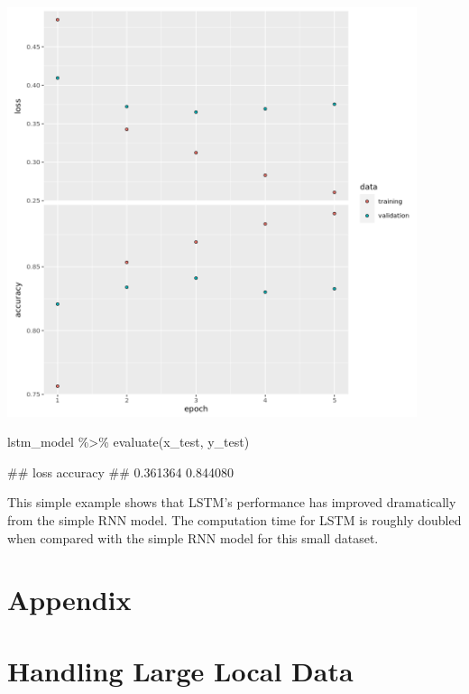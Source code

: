 \documentclass[
  12pt,
]{krantz}
\makeatletter
\newenvironment{Shaded}{\begin{snugshade}}{\end{snugshade}}
\newcommand{\FunctionTok}[1]{\textcolor[rgb]{0,0,0}{#1}}
\newcommand{\NormalTok}[1]{#1}
\newcommand{\SpecialCharTok}[1]{\textcolor[rgb]{0,0,0}{#1}}
\newenvironment{kframe}{%
\medskip{}
\setlength{\fboxsep}{.8em}
 \def\at@end@of@kframe{}%
 \ifinner\ifhmode%
  \def\at@end@of@kframe{\end{minipage}}%
  \begin{minipage}{\columnwidth}%
 \fi\fi%
 \def\FrameCommand##1{\hskip\@totalleftmargin \hskip-\fboxsep
 \colorbox{shadecolor}{##1}\hskip-\fboxsep
     \hskip-\linewidth \hskip-\@totalleftmargin \hskip\columnwidth}%
 \MakeFramed {\advance\hsize-\width
   \@totalleftmargin\z@ \linewidth\hsize
   \@setminipage}}%
 {\par\unskip\endMakeFramed%
 \at@end@of@kframe}
\renewenvironment{Shaded}{\begin{kframe}}{\end{kframe}}
\makeatother
\begin{document}
\includegraphics[width=0.9\textwidth,height=\textheight]{images/rnnhandson2.png}

\begin{Shaded}
\begin{Highlighting}[]
\NormalTok{lstm\_model }\SpecialCharTok{\%\textgreater{}\%}
   \FunctionTok{evaluate}\NormalTok{(x\_test, y\_test)}
\end{Highlighting}
\end{Shaded}

\begin{Shaded}
\begin{Highlighting}[]
\NormalTok{\#\#     loss accuracy }
\NormalTok{\#\# 0.361364 0.844080}
\end{Highlighting}
\end{Shaded}

This simple example shows that LSTM's performance has improved dramatically from the simple RNN model. The computation time for LSTM is roughly doubled when compared with the simple RNN model for this small dataset.

\hypertarget{appendix}{%
\chapter*{Appendix}\label{appendix}}


\hypertarget{largelocaldata}{%
\chapter{Handling Large Local Data}\label{largelocaldata}}
\end{document}
